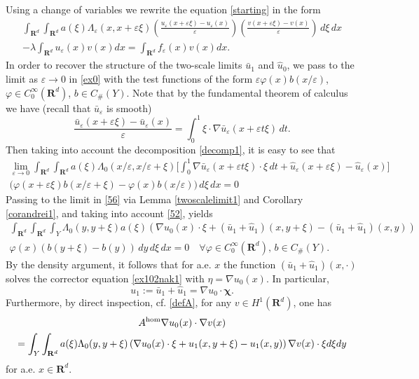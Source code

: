 \documentclass[11pt]{article}
\newcommand\e {\varepsilon}
\newcommand{\R}{\mathbf{R}}
\theoremstyle{remark}
\begin{document}
 Using a change of variables we rewrite the equation \eqref{starting} in the form
\begin{multline} \label{ex0}
	\int_{\R^d} \int_{\R^d} a(\xi)\Lambda_\e (x, x+\e\xi)\left(\frac{u_\e (x+\e \xi)-u_\e (x)}\e  \right) \left(\frac{v(x+\e \xi)-v(x)}\e  \right)\,d\xi\,dx
	\\
	- \lambda \int_{\R^d} u_\e  (x)v(x) dx=\int_{\R^d} f_\e  (x) v(x) dx.
\end{multline}
In order to recover the structure of the two-scale limits $\bar{u}_1$ and $\hat u_0$, we pass to the limit as $\e \to 0$ in \eqref{ex0}  with the test functions of the form $\e \varphi(x) b(x/\e)$,  $\varphi \in C_0^\infty(\mathbf{R}^d)$, $b \in C_\#(Y)$.
Note that by the fundamental theorem of calculus we have (recall that  $\bar{u}_\e $ is smooth)
\begin{equation} \label{formula11}
	\frac{\bar{u}_\e (x+\e \xi)-\bar{u}_\e (x)}\e =\int_0^1 \xi \cdot\nabla \bar{u}_\e (x+\e    t \xi) \,dt.
\end{equation}
Then taking into account the decomposition \eqref{decomp1}, it is easy to see that
\begin{multline}\label{56}
\lim_{\e \to 0} \int_{\R^d} \int_{\R^d} 	a(\xi)\Lambda_0({x}/\e , {x/\e+\xi}) \Big[ \int_0^1  \nabla \bar{u}_\e (x+\e    t \xi) \cdot\xi  \,dt+\hat{u}_\e (x+\e \xi)-\hat{u}_\e (x)\Big]
\\
 \Big(\varphi(x+\e\xi)   b(x/\e+\xi )-\varphi(x)b(x/\e)\Big) \, d\xi\,dx 	= 0
\end{multline} 	
Passing to the limit  in \eqref{56} via Lemma \ref{twoscalelimit1} and Corollary \ref{corandrei1}, and taking into account \eqref{52}, yields
\begin{multline}\label{57a}
	 \int_{\R^d} \int_{\R^d}\int_{Y} \Lambda_0 (y,y+\xi) a(\xi) \left(  \nabla u_0(x) \cdot \xi +(\bar{u}_1+\hat{u}_1)(x,y+\xi)-(\bar{u}_1+\hat{u}_1)(x,y) \right)
	 \\
	 \varphi(x)  \left(b(y+\xi)-b(y) \right) \,dy\, d\xi \, dx=0 \quad \forall \varphi \in C_0^\infty(\mathbf{R}^d), \,b \in C_\#(Y).
\end{multline} 	
By the density argument, it follows that for a.e. $x$ the function $(\bar{u}_1+\hat{u}_1)(x,\cdot)$ solves the corrector equation \eqref{ex102nak1} with $\eta = \nabla u_0(x)$. In particular,
\begin{equation*} %
u_1:=	\bar{u}_1+\hat{u}_1=  \nabla u_0 \cdot \mathbf{\chi}  .
\end{equation*}
Furthermore, by direct inspection, cf. \eqref{defA}, for any $v \in H^1 (\R^d)$, one has
\begin{multline} \label{estimate72}
 	A^{\rm hom} \nabla u_0(x) \cdot \nabla v(x)
\\
=	\int_{Y} \int_{\R^d} a(\xi) \Lambda_0 (y,y+\xi)\left(  \nabla u_0(x) \cdot\xi +u_1(x,y+\xi)-u_1(x,y) \right)   \nabla v(x) \cdot\xi   d\xi dy
\end{multline}
for a.e. $x \in \R^d$.
\end{document}
